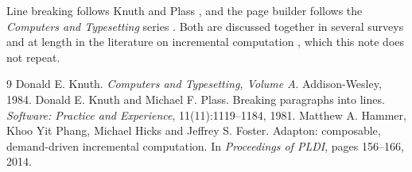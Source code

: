 \documentclass{article}
\begin{document}
Line breaking follows Knuth and Plass \cite{plass81}, and the page builder
follows the \emph{Computers and Typesetting} series \cite{knuth84}. Both are
discussed together in several surveys \cite{knuth84,plass81} and at length in
the literature on incremental computation \cite{adapton}, which this note does
not repeat.

\begin{thebibliography}{9}
 Donald E. Knuth. \emph{Computers and Typesetting, Volume A}. Addison-Wesley, 1984.
 Donald E. Knuth and Michael F. Plass. Breaking paragraphs
  into lines. \emph{Software: Practice and Experience}, 11(11):1119--1184, 1981.
 Matthew A. Hammer, Khoo Yit Phang, Michael Hicks and
  Jeffrey S. Foster. Adapton: composable, demand-driven incremental
  computation. In \emph{Proceedings of PLDI}, pages 156--166, 2014.
\end{thebibliography}
\end{document}
